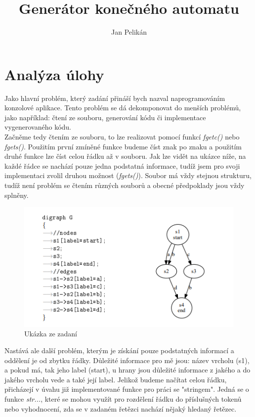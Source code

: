 \documentclass[czech,SP]{thesiskiv}
\author{Jan Pelikán}
\title{Generátor konečného automatu}
\begin{document}
%
\maketitle
\tableofcontents

\chapter{Analýza úlohy}
{Jako hlavní problém, který zadání přináší bych nazval naprogramováním konzolové aplikace. Tento problém se dá dekomponovat do menších problémů, jako například: čtení ze souboru, generování kódu či implementace vygenerovaného kódu.}\\
{Začněme tedy čtením ze souboru, to lze realizovat pomocí funkcí \textit{fgetc()} nebo \textit{fgets()}. Použitím první zmíněné funkce budeme číst znak po znaku a použitím druhé funkce lze číst celou řádku až v souboru. Jak lze vidět na ukázce níže, na každé řádce se nachází pouze jedna podstatná informace, tudíž jsem pro svoji implementaci zvolil druhou možnost (\textit{fgets()}). Soubor má vždy stejnou strukturu, tudíž není problém se čtením různých souborů a obecné předpoklady jsou vždy splněny.} 
\begin{figure}[!ht]
\centering
\includegraphics[width=\textwidth]{ukazka_zadani.png} 
\caption{Ukázka ze zadaní}
\label{ukazka}
\end{figure}
{Nastává ale další problém, kterým je získání pouze podstatných informací a oddělení je od zbytku řádky. Důležité informace pro mě jsou: název vrcholu (s1), a pokud má, tak jeho label (start), u hrany jsou důležité informace z jakého a do jakého vrcholu vede a také její label. Jelikož budeme načítat celou řádku, přicházejí v úvahu již implementované funkce pro práci se "stringem". Jedná se o funkce \textit{str...}, které se mohou využít pro rozdělení řádku do příslušných tokenů nebo vyhodnocení, zda se v zadaném řetězci nachází nějaký hledaný řetězec.}\\
\end{document}
